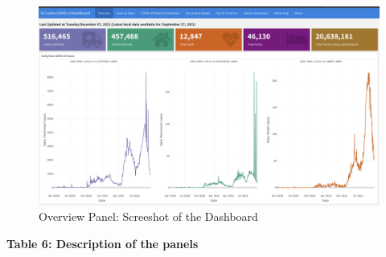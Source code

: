 \documentclass[
]{article}
\begin{document}
\begin{figure}

{\centering \includegraphics[width=0.8\linewidth]{images/dashboard} 

}

\caption{Overview Panel: Screeshot of the Dashboard}\label{fig:unnamed-chunk-1}
\end{figure}

\newpage

\textbf{Table 6: Description of the panels}
\end{document}
